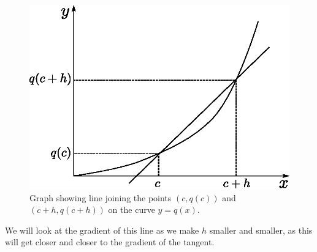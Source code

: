 \begin{figure}[H]
\centering
\includegraphics[scale=0.8]{img/chord}
\caption{Graph showing line joining the points $(c,q(c))$ and $(c+h,q(c+h))$ on the curve $y=q(x)$.}
\label{fig:chord}
\end{figure}

We will look at the gradient of this line as we make $h$ smaller and smaller, as this will get closer and closer to the gradient of the tangent.

